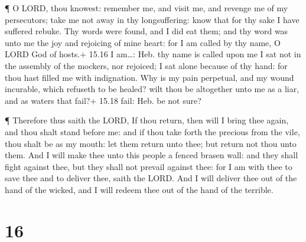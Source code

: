  ¶ O LORD, thou knowest: remember me, and visit me, and
revenge me of my persecutors; take me not away in thy longsuffering:
know that for thy sake I have suffered rebuke.  Thy words
were found, and I did eat them; and thy word was unto me the joy and
rejoicing of mine heart: for I am called by thy name, O LORD God of
hosts.+ 15.16 I am\ldots: Heb. thy name is called upon me 
I sat not in the assembly of the mockers, nor rejoiced; I sat alone
because of thy hand: for thou hast filled me with indignation.
 Why is my pain perpetual, and my wound incurable, which
refuseth to be healed? wilt thou be altogether unto me as a liar, and as
waters that fail?+ 15.18 fail: Heb. be not sure?

 ¶ Therefore thus saith the LORD, If thou return, then will
I bring thee again, and thou shalt stand before me: and if thou take
forth the precious from the vile, thou shalt be as my mouth: let them
return unto thee; but return not thou unto them.  And I
will make thee unto this people a fenced brasen wall: and they shall
fight against thee, but they shall not prevail against thee: for I am
with thee to save thee and to deliver thee, saith the LORD.
 And I will deliver thee out of the hand of the wicked, and
I will redeem thee out of the hand of the terrible.

\hypertarget{section-15}{%
\section{16}\label{section-15}}

